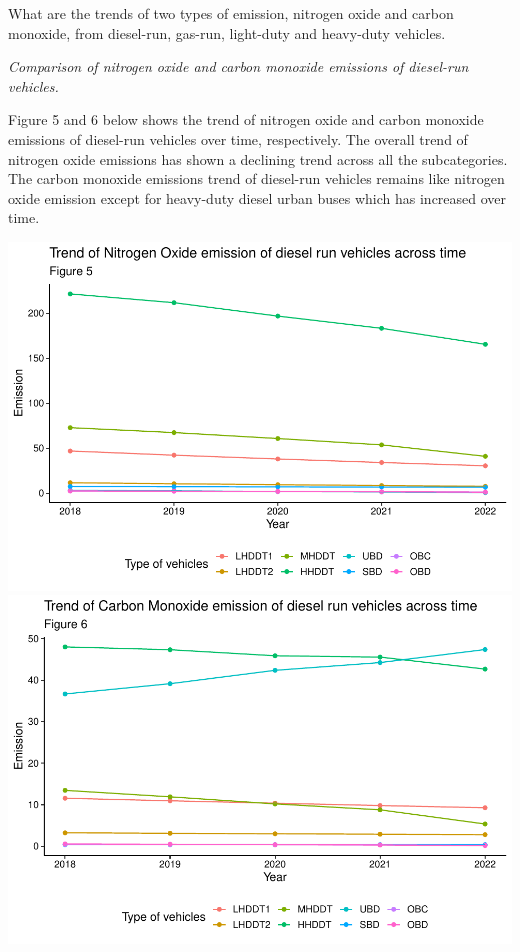 \documentclass[
  12pt,
]{article}
\begin{document}
What are the trends of two types of emission, nitrogen oxide and carbon
monoxide, from diesel-run, gas-run, light-duty and heavy-duty vehicles.

\emph{Comparison of nitrogen oxide and carbon monoxide emissions of
diesel-run vehicles.}

Figure 5 and 6 below shows the trend of nitrogen oxide and carbon
monoxide emissions of diesel-run vehicles over time, respectively. The
overall trend of nitrogen oxide emissions has shown a declining trend
across all the subcategories. The carbon monoxide emissions trend of
diesel-run vehicles remains like nitrogen oxide emission except for
heavy-duty diesel urban buses which has increased over time.

\includegraphics{Code_Main-Markdown_files/figure-latex/unnamed-chunk-5-1.pdf}
\includegraphics{Code_Main-Markdown_files/figure-latex/unnamed-chunk-5-2.pdf}
\end{document}
